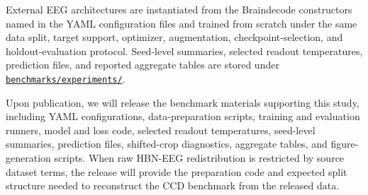 \documentclass[12pt]{article}
\begin{document}
External EEG architectures are instantiated from the Braindecode constructors \citep{braindecode} named in the YAML configuration files and trained from scratch under the same data split, target support, optimizer, augmentation, checkpoint-selection, and holdout-evaluation protocol. Seed-level summaries, selected readout temperatures, prediction files, and reported aggregate tables are stored under \href{https://github.com/sneddy/neurosned/tree/main/benchmarks/experiments}{\texttt{benchmarks/experiments/}}.

Upon publication, we will release the benchmark materials supporting this study, including YAML configurations, data-preparation scripts, training and evaluation runners, model and loss code, selected readout temperatures, seed-level summaries, prediction files, shifted-crop diagnostics, aggregate tables, and figure-generation scripts. When raw HBN-EEG redistribution is restricted by source dataset terms, the release will provide the preparation code and expected split structure needed to reconstruct the CCD benchmark from the released data.


\FloatBarrier







% 




\end{document}
